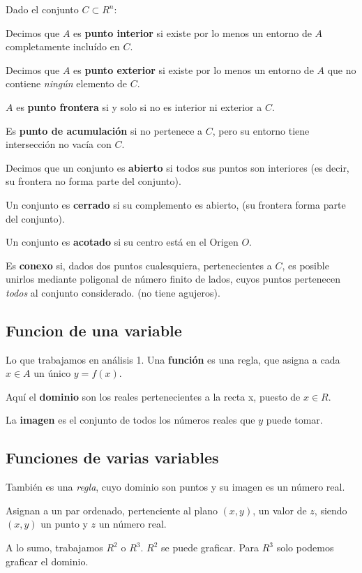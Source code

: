 Dado el conjunto \(C \subset R^{n}\):

Decimos que \(A\) es \textbf{punto interior} si existe por lo menos un entorno de \(A\)
completamente incluído en \(C\).

Decimos que \(A\) es \textbf{punto exterior} si existe por lo menos un entorno de \(A\)
que no contiene \textit{ningún} elemento de \(C\).

\(A\) es \textbf{punto frontera} si y solo si no es interior ni exterior a \(C\).

Es \textbf{punto de acumulación} si no pertenece a \(C\),
pero su entorno tiene intersección no vacía con \(C\).

Decimos que un conjunto es \textbf{abierto} si todos sus puntos son interiores
(es decir, su frontera no forma parte del conjunto).

Un conjunto es \textbf{cerrado} si su complemento es abierto,
(su frontera forma parte del conjunto).

Un conjunto es \textbf{acotado} si su centro está en el Origen \(O\).

Es \textbf{conexo} si, dados dos puntos cualesquiera,
pertenecientes a \(C\),
es posible unirlos mediante poligonal de número finito de lados,
cuyos puntos pertenecen \textit{todos}
al conjunto considerado.
(no tiene agujeros).

\subsection{Funcion de una variable}

Lo que trabajamos en análisis 1.
Una \textbf{función} es una regla, 
que asigna a cada \(x \in A\) un único \(y = f(x)\).

Aquí el \textbf{dominio} son los reales pertenecientes a la recta x,
puesto de \(x \in R\).

La \textbf{imagen} es el conjunto de todos los números reales que \(y\) puede tomar.

\subsection{Funciones de varias variables}

También es una \textit{regla},
cuyo dominio son puntos y su imagen es un número real.

Asignan a un par ordenado,
pertenciente al plano \((x,y)\), 
un valor de \(z\),
siendo \((x,y)\) un punto y \(z\) un número real.

A lo sumo, trabajamos \(R^{2}\) o \(R^{3}\).
\(R^{2}\) se puede graficar.
Para \(R^{3}\) solo podemos graficar el dominio.

